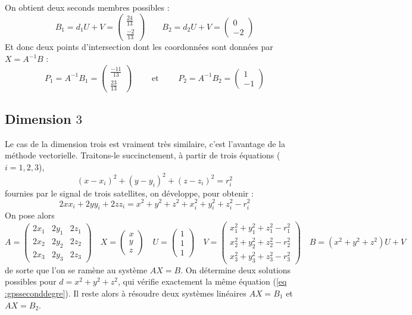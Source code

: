 \documentclass[class=report,crop=false]{standalone}
\begin{document}
\begin{exemple}
On obtient deux seconds membres possibles :
$$B_1 = d_1 U + V = \begin{pmatrix}\frac{24}{13}\\\frac{-2}{13}\end{pmatrix}\qquad
B_2 = d_2 U + V = \begin{pmatrix}0\\-2\end{pmatrix}$$                      
Et donc deux points d'intersection dont les coordonnées sont données 
par $X= A^{-1}B$ :
$$P_1 = A^{-1}B_1 = \begin{pmatrix}\frac{-11}{13}\\\frac{23}{13}\end{pmatrix}
\qquad \text{ et } \qquad
P_2 = A^{-1}B_2 = \begin{pmatrix}1\\-1\end{pmatrix}$$ 
\end{exemple}

\subsection{Dimension $3$}

Le cas de la dimension trois est vraiment très similaire, c'est l'avantage de la méthode vectorielle.
Traitons-le succinctement,
à partir de trois équations ($i=1,2,3$), 
$$(x-x_i)^2 + (y-y_i)^2 + (z-z_i)^2 = r_i^2$$
fournies par le signal de trois satellites, on développe, pour obtenir :
$$2xx_i + 2yy_i + 2zz_i = x^2+y^2+z^2 + x_i^2 + y_i^2 +z_i^2 - r_i^2$$
On pose alors
$$
A = \begin{pmatrix}2x_1&2y_1&2z_1\\2x_2&2y_2&2z_2\\2x_3&2y_3&2z_3\end{pmatrix}\quad
X = \begin{pmatrix}x\\y\\z\end{pmatrix}\quad
U = \begin{pmatrix}1\\1\\1\end{pmatrix} \quad
V = \begin{pmatrix}
x_1^2 + y_1^2 +z_1^2 - r_1^2\\
x_2^2 + y_2^2 +z_2^2 - r_2^2\\
x_3^2 + y_3^2 +z_3^2 - r_3^2
\end{pmatrix}\quad
B = (x^2+y^2+z^2) U + V$$
de sorte que l'on se ramène au système $AX=B$.
On détermine deux solutions possibles pour $d=x^2+y^2+z^2$, 
qui vérifie exactement la même équation (\ref{eq :gpsseconddegre}).
Il reste alors à résoudre deux systèmes linéaires $AX=B_1$ et $AX=B_2$.
\end{document}
